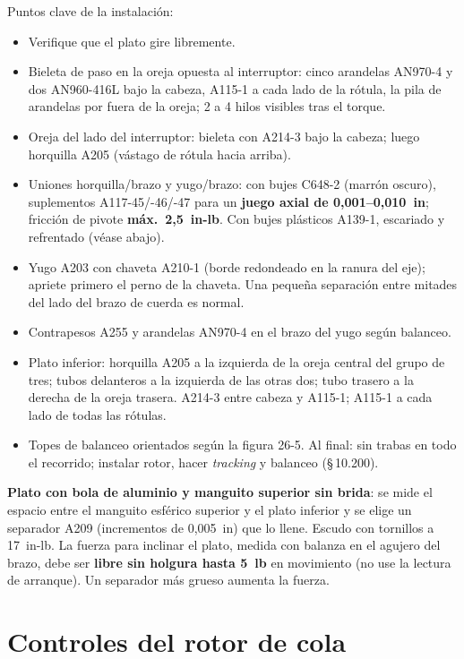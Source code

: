 Puntos clave de la instalación:
\begin{itemize}
\item Verifique que el plato gire libremente.
\item Bieleta de paso en la oreja opuesta al interruptor: cinco arandelas AN970-4 y dos AN960-416L bajo la cabeza, A115-1 a cada lado de la rótula, la pila de arandelas por fuera de la oreja; 2 a 4 hilos visibles tras el torque.
\item Oreja del lado del interruptor: bieleta con A214-3 bajo la cabeza; luego horquilla A205 (vástago de rótula hacia arriba).
\item Uniones horquilla/brazo y yugo/brazo: con bujes C648-2 (marrón oscuro), suplementos A117-45/-46/-47 para un \textbf{juego axial de 0,001--0,010~in}; fricción de pivote \textbf{máx.\ 2,5~in-lb}. Con bujes plásticos A139-1, escariado y refrentado (véase abajo).
\item Yugo A203 con chaveta A210-1 (borde redondeado en la ranura del eje); apriete primero el perno de la chaveta. Una pequeña separación entre mitades del lado del brazo de cuerda es normal.
\item Contrapesos A255 y arandelas AN970-4 en el brazo del yugo según balanceo.
\item Plato inferior: horquilla A205 a la izquierda de la oreja central del grupo de tres; tubos delanteros a la izquierda de las otras dos; tubo trasero a la derecha de la oreja trasera. A214-3 entre cabeza y A115-1; A115-1 a cada lado de todas las rótulas.
\item Topes de balanceo orientados según la figura 26-5. Al final: sin trabas en todo el recorrido; instalar rotor, hacer \emph{tracking} y balanceo (\S\,10.200).
\end{itemize}

\textbf{Plato con bola de aluminio y manguito superior sin brida}: se mide el espacio entre el manguito esférico superior y el plato inferior y se elige un separador A209 (incrementos de 0,005~in) que lo llene. Escudo con tornillos a 17~in-lb. La fuerza para inclinar el plato, medida con balanza en el agujero del brazo, debe ser \textbf{libre sin holgura hasta 5~lb} en movimiento (no use la lectura de arranque). Un separador más grueso aumenta la fuerza.

\section{Controles del rotor de cola}

